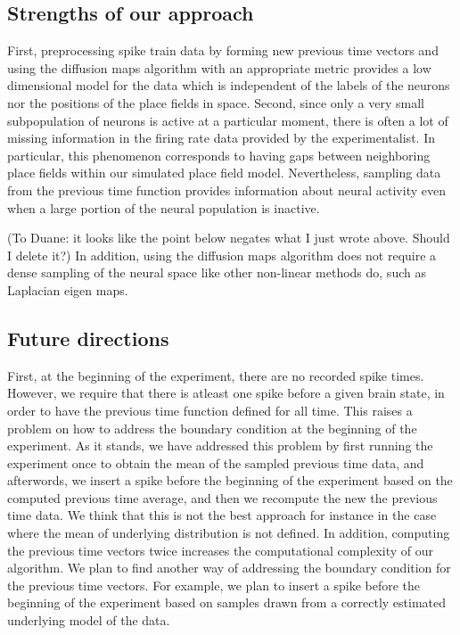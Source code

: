 \subsection{Strengths of our approach}
First, preprocessing spike train data by forming new previous time vectors and using the diffusion maps algorithm with an appropriate metric provides a low dimensional model for the data which is independent of the labels of the neurons nor the positions of the place fields in space. 
Second, since only a very small subpopulation of neurons is active at a particular moment, there is often a lot of missing information in the firing rate data provided by the experimentalist.
In particular, this phenomenon corresponds to having gaps between 
neighboring place fields within our simulated place field model. Nevertheless, sampling data from the previous time function provides information about neural activity even when a large portion of the neural population is inactive. 

(To Duane: it looks like the point below negates what I just wrote above.
Should I delete it?)
In addition, using the diffusion maps algorithm does not require a dense sampling
of the neural space like other non-linear methods do, such as Laplacian eigen maps.

\subsection{Future directions}
First, at the beginning of the experiment, there are no recorded spike times.
However, we require that there is atleast one spike before a given brain state,
in order to have the previous time function defined for all time.
This raises a problem on how to address the boundary condition at the beginning
of the experiment. As it stands, we have addressed this problem by first running the experiment once to obtain the mean of the sampled previous time data, and afterwords, we insert a spike before the beginning of the experiment based on the computed previous time average, and then we recompute the new the previous time data. We think that this is not the best approach for instance in the case where the mean of underlying distribution is not defined. In addition, computing the previous time vectors twice increases the computational complexity of our algorithm. We plan to find another way of addressing the boundary condition
for the previous time vectors. For example, we plan to insert a spike before the beginning of the experiment based on samples drawn from a correctly estimated underlying model of the data.\\

